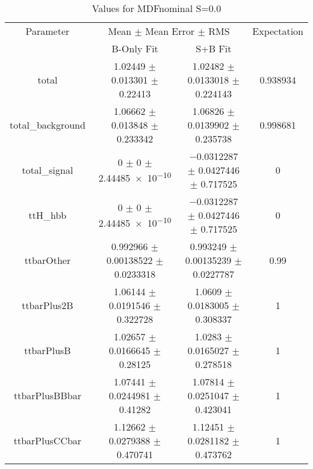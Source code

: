 \begin{table}
\centering
\caption{Values for MDFnominal S=0.0}
\begin{tabular}{cccc}
\toprule
Parameter & \multicolumn{2}{c}{Mean $\pm$ Mean Error $\pm$ RMS} & Expectation\\
 & B-Only Fit & S+B Fit & \\
\midrule
total & \num{1.02449} $\pm$ \num{0.013301} $\pm$ \num{0.22413} & \num{1.02482} $\pm$ \num{0.0133018} $\pm$ \num{0.224143} & \num{0.938934}\\
total\_background & \num{1.06662} $\pm$ \num{0.013848} $\pm$ \num{0.233342} & \num{1.06826} $\pm$ \num{0.0139902} $\pm$ \num{0.235738} & \num{0.998681}\\
total\_signal & \num{0} $\pm$ \num{0} $\pm$ \num{2.44485e-10} & \num{-0.0312287} $\pm$ \num{0.0427446} $\pm$ \num{0.717525} & \num{0}\\
ttH\_hbb & \num{0} $\pm$ \num{0} $\pm$ \num{2.44485e-10} & \num{-0.0312287} $\pm$ \num{0.0427446} $\pm$ \num{0.717525} & \num{0}\\
ttbarOther & \num{0.992966} $\pm$ \num{0.00138522} $\pm$ \num{0.0233318} & \num{0.993249} $\pm$ \num{0.00135239} $\pm$ \num{0.0227787} & \num{0.99}\\
ttbarPlus2B & \num{1.06144} $\pm$ \num{0.0191546} $\pm$ \num{0.322728} & \num{1.0609} $\pm$ \num{0.0183005} $\pm$ \num{0.308337} & \num{1}\\
ttbarPlusB & \num{1.02657} $\pm$ \num{0.0166645} $\pm$ \num{0.28125} & \num{1.0283} $\pm$ \num{0.0165027} $\pm$ \num{0.278518} & \num{1}\\
ttbarPlusBBbar & \num{1.07441} $\pm$ \num{0.0244981} $\pm$ \num{0.41282} & \num{1.07814} $\pm$ \num{0.0251047} $\pm$ \num{0.423041} & \num{1}\\
ttbarPlusCCbar & \num{1.12662} $\pm$ \num{0.0279388} $\pm$ \num{0.470741} & \num{1.12451} $\pm$ \num{0.0281182} $\pm$ \num{0.473762} & \num{1}\\
\bottomrule
\end{tabular}
\end{table}